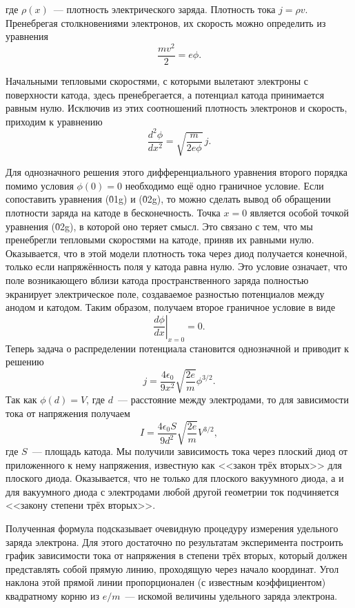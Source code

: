 \documentclass[a4paper,10pt,twoside]{article}
\begin{document}
где $\rho(x)$~--- плотность электрического заряда. Плотность тока $j=\rho v$. Пренебрегая столкновениями электронов, их скорость можно определить из уравнения
$$
\frac{mv^2}{2}=e\phi.
$$

Начальными тепловыми скоростями, с которыми вылетают электроны с поверхности катода, здесь пренебрегается, а потенциал катода принимается равным нулю. Исключив из этих соотношений плотность электронов и скорость, приходим к уравнению
\begin{equation}
\frac{d^2\phi}{dx^2}=\sqrt{\frac{m}{2e\phi}}\, j.
\end{equation}

Для однозначного решения этого дифференциального уравнения второго порядка помимо условия $\phi(0)=0$ необходимо ещё одно граничное условие. Если сопоставить уравнения (\r{01g}) и (\r{02g}), то можно сделать вывод об обращении плотности заряда на катоде в бесконечность. Точка $x=0$ является особой точкой уравнения (\r{02g}), в которой оно теряет смысл.
Это связано с тем, что мы пренебрегли тепловыми скоростями на катоде, приняв их равными нулю. Оказывается, что в этой модели плотность тока через диод получается конечной, только если напряжённость поля у катода равна нулю. Это условие означает, что поле возникающего вблизи катода пространственного заряда полностью экранирует электрическое поле, создаваемое разностью потенциалов между анодом и катодом. Таким образом, получаем второе граничное условие в виде
$$
\left.\frac{d\phi}{dx}\right|_{x = 0}=0.
$$
Теперь задача о распределении потенциала становится однозначной и приводит к решению
$$
j=\frac{4\epsilon_0}{9x^2}\sqrt{\frac{2e}{m}}\phi^{3/2}.
$$
Так как $\phi(d)=V$, где $d$~--- расстояние между электродами, то для зависимости тока от напряжения получаем
$$
I=\frac{4\epsilon_0 S}{9d^2}\sqrt{\frac{2e}{m}}V^{3/2},
$$
где $S$~--- площадь катода. Мы получили зависимость тока через плоский диод от приложенного к нему напряжения, известную как <<закон трёх вторых>> для плоского диода. Оказывается, что не только для плоского вакуумного диода, а и для вакуумного диода с электродами любой другой геометрии ток подчиняется <<закону степени трёх вторых>>.

Полученная формула подсказывает очевидную процедуру измерения удельного заряда электрона. Для этого достаточно по
результатам эксперимента построить график зависимости тока от напряжения в степени трёх вторых, который должен
представлять собой прямую линию, проходящую через начало координат. Угол наклона этой прямой линии пропорционален (с известным коэффициентом) квадратному корню из $e/m$~--- искомой величины удельного заряда электрона.
\end{document}
